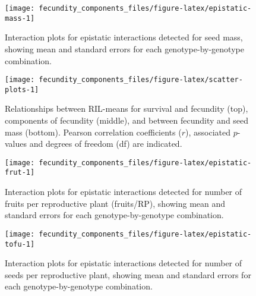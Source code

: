 \documentclass[]{article}
\begin{document}
\newpage

\begin{figure}

{\centering \texttt{[image: fecundity\_components\_files/figure-latex/epistatic-mass-1]} 

}

\caption[Epistatic interactions for seed mass]{Interaction plots for epistatic interactions detected for seed mass, showing mean and standard errors for each genotype-by-genotype combination.}\label{fig:epistatic-mass}
\end{figure}

\newpage

\begin{figure}

{\centering \texttt{[image: fecundity\_components\_files/figure-latex/scatter-plots-1]} 

}

\caption[Scatter plots between RIL-means for survival and fecundity, components of fecundity, and between overall fecundity and seed mass]{Relationships between RIL-means for survival and fecundity (top), components of fecundity (middle), and between fecundity and seed mass (bottom). Pearson correlation coefficients ($r$), associated $p$-values and degrees of freedom (df) are indicated.}\label{fig:scatter-plots}
\end{figure}

\newpage

\begin{figure}

{\centering \texttt{[image: fecundity\_components\_files/figure-latex/epistatic-frut-1]} 

}

\caption[Epistatic interactions for number of fruits per reproductive plant]{Interaction plots for epistatic interactions detected for number of fruits per reproductive plant (fruits/RP), showing mean and standard errors for each genotype-by-genotype combination.}\label{fig:epistatic-frut}
\end{figure}

\newpage

\begin{figure}

{\centering \texttt{[image: fecundity\_components\_files/figure-latex/epistatic-tofu-1]} 

}

\caption[Epistatic interactions for seeds/RP]{Interaction plots for epistatic interactions detected for number of seeds per reproductive plant, showing mean and standard errors for each genotype-by-genotype combination.}\label{fig:epistatic-tofu}
\end{figure}
\end{document}
